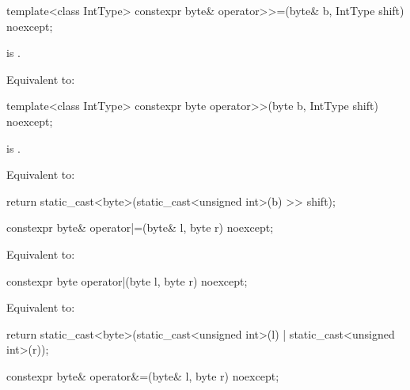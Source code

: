 %
\begin{itemdecl}
template<class IntType>
  constexpr byte& operator>>=(byte& b, IntType shift) noexcept;
\end{itemdecl}

\begin{itemdescr}
\pnum
\constraints
{} is .

\pnum
\effects
Equivalent to:
\end{itemdescr}

%
\begin{itemdecl}
template<class IntType>
  constexpr byte operator>>(byte b, IntType shift) noexcept;
\end{itemdecl}

\begin{itemdescr}
\pnum
\constraints
{} is .

\pnum
\effects
Equivalent to:
\begin{codeblock}
return static_cast<byte>(static_cast<unsigned int>(b) >> shift);
\end{codeblock}
\end{itemdescr}

%
\begin{itemdecl}
constexpr byte& operator|=(byte& l, byte r) noexcept;
\end{itemdecl}

\begin{itemdescr}
\pnum
\effects
Equivalent to: 
\end{itemdescr}

%
\begin{itemdecl}
constexpr byte operator|(byte l, byte r) noexcept;
\end{itemdecl}

\begin{itemdescr}
\pnum
\effects
Equivalent to:
\begin{codeblock}
return static_cast<byte>(static_cast<unsigned int>(l) | static_cast<unsigned int>(r));
\end{codeblock}
\end{itemdescr}

%
\begin{itemdecl}
constexpr byte& operator&=(byte& l, byte r) noexcept;
\end{itemdecl}

